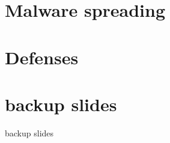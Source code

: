 \section{Malware spreading}


\section{Defenses}















\section{backup slides}
\begin{frame}{backup slides}
\end{frame}


